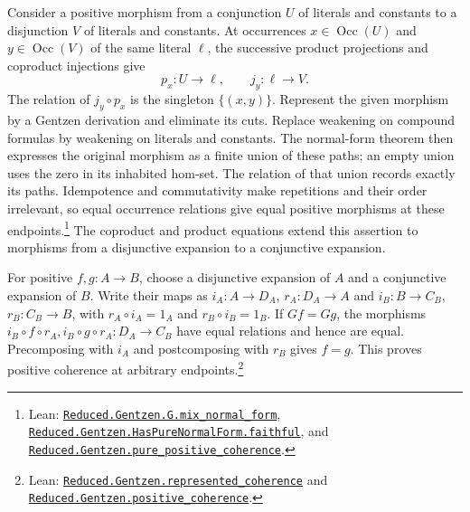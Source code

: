 \documentclass[11pt]{article}
\newcommand{\Occ}{\operatorname{Occ}}
\begin{document}
Consider a positive morphism from a conjunction $U$ of literals
and constants to a disjunction $V$ of literals and constants.
At occurrences $x\in\Occ(U)$ and $y\in\Occ(V)$ of the same
literal $\ell$, the successive product projections and coproduct
injections give
\[
 p_x:U\longrightarrow\ell,\qquad
 j_y:\ell\longrightarrow V.
\]
The relation of $j_y\circ p_x$ is the singleton $\{(x,y)\}$.
Represent the given morphism by a Gentzen derivation and eliminate
its cuts. Replace weakening on compound formulas by weakening on
literals and constants. The normal-form theorem then expresses
the original morphism as a finite union of these paths; an empty
union uses the zero in its inhabited hom-set. The relation of that union records
exactly its paths. Idempotence and commutativity make repetitions
and their order irrelevant, so equal occurrence relations give
equal positive morphisms at these endpoints.\footnote{\raggedright Lean:
\href{https://github.com/flengyel/Dosen-Petric-Maximality/blob/5dbee39bea09539bd130f729e82636419f71f920/DosenPetric/GentzenMixNormalForm.lean\#L37}{\texttt{Reduced.Gentzen.G.\allowbreak{}mix\_normal\_form}},
\href{https://github.com/flengyel/Dosen-Petric-Maximality/blob/5dbee39bea09539bd130f729e82636419f71f920/DosenPetric/GentzenPureNormalForms.lean\#L84}{\texttt{Reduced.Gentzen.HasPureNormalForm.\allowbreak{}faithful}}, and
\href{https://github.com/flengyel/Dosen-Petric-Maximality/blob/5dbee39bea09539bd130f729e82636419f71f920/DosenPetric/GentzenPurePositiveCoherence.lean\#L14}{\texttt{Reduced.Gentzen.\allowbreak{}pure\_positive\_coherence}}.}
The coproduct and product equations extend this assertion to
morphisms from a disjunctive expansion to a conjunctive expansion.

For positive $f,g:A\to B$, choose a disjunctive expansion of $A$
and a conjunctive expansion of $B$. Write their maps as
$i_A:A\to D_A$, $r_A:D_A\to A$ and
$i_B:B\to C_B$, $r_B:C_B\to B$, with
$r_A\circ i_A=1_A$ and $r_B\circ i_B=1_B$.
If $Gf=Gg$, the morphisms
$i_B\circ f\circ r_A,i_B\circ g\circ r_A:D_A\to C_B$
have equal relations and hence are equal. Precomposing with
$i_A$ and postcomposing with $r_B$ gives $f=g$.
This proves positive coherence at arbitrary endpoints.\footnote{\raggedright Lean:
\href{https://github.com/flengyel/Dosen-Petric-Maximality/blob/5dbee39bea09539bd130f729e82636419f71f920/DosenPetric/GentzenPositiveCoherence.lean\#L14}{\texttt{Reduced.Gentzen.\allowbreak{}represented\_coherence}} and
\href{https://github.com/flengyel/Dosen-Petric-Maximality/blob/5dbee39bea09539bd130f729e82636419f71f920/DosenPetric/GentzenPositiveCoherence.lean\#L31}{\texttt{Reduced.Gentzen.\allowbreak{}positive\_coherence}}.}
\end{document}
